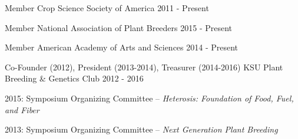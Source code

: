 
\begin{cventries}

  \cventry
    {Member} %
    {Crop Science Society of America} %
    {} %
    {2011 - Present} %
    {}

  \cventry
    {Member} %
    {National Association of Plant Breeders} %
    {} %
    {2015 - Present} %
    {}

  \cventry
    {Member} %
    {American Academy of Arts and Sciences} %
    {} %
    {2014 - Present} %
    {}

  \cventry
    {Co-Founder (2012), President (2013-2014), Treasurer (2014-2016)} %
    {KSU Plant Breeding \& Genetics Club} %
    {} %
    {2012 - 2016} %
    {
      \begin{cvitems} %
        \item {2015: Symposium Organizing Committee – \textit{Heterosis: Foundation of Food, Fuel, and Fiber}}
        \item {2013: Symposium Organizing Committee – \textit{Next Generation Plant Breeding}}
      \end{cvitems}
    }

\end{cventries}
